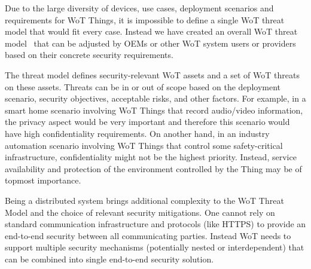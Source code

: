 
Due to the large diversity of devices,
use cases,
deployment scenarios 
and requirements for WoT Things,
it is impossible to define a single WoT threat model
that would fit every case.
Instead we have created an overall WoT threat model~\cite{Wot2017sec} 
that can be adjusted by OEMs or other WoT system users or providers
based on their concrete security requirements.


The threat model defines security-relevant WoT assets 
and a set of WoT threats on these assets.
Threats can be in or out of scope based on the deployment scenario,
security objectives, acceptable risks, and other factors.
For example,
in a smart home scenario involving WoT Things that record audio/video
information, the privacy aspect would be very important and 
therefore this scenario would have high confidentiality requirements.
On another hand,
in an industry automation scenario involving WoT Things that 
control some safety-critical infrastructure,
confidentiality might not be the highest priority.
Instead, service availability
and protection of the environment controlled by the Thing 
may be of topmost importance.

Being a distributed system brings additional complexity 
to the WoT Threat Model and the choice of relevant security mitigations.
One cannot rely on standard communication infrastructure and protocols 
(like HTTPS) to provide an end-to-end security between all communicating
parties.
Instead WoT needs to support multiple security mechanisms 
(potentially nested or interdependent) 
that can be combined into single end-to-end security solution.  
  
